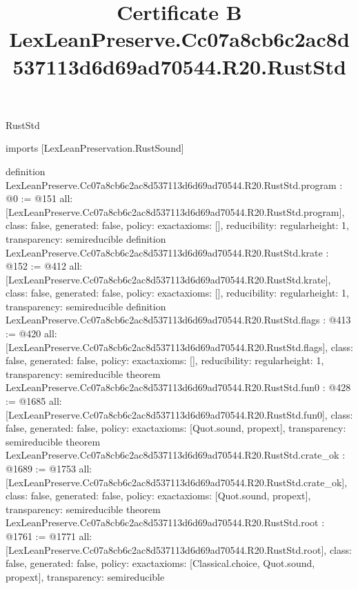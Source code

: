 \begin{lexlean}{RustStd}
\title{Certificate B LexLeanPreserve.Cc07a8cb6c2ac8d537113d6d69ad70544.R20.RustStd}
\begin{coremodule}
imports [LexLeanPreservation.RustSound]

definition LexLeanPreserve.Cc07a8cb6c2ac8d537113d6d69ad70544.R20.RustStd.program : @0 := @151 {
  all: [LexLeanPreserve.Cc07a8cb6c2ac8d537113d6d69ad70544.R20.RustStd.program],
  class: false,
  generated: false,
  policy: exact{axioms: []},
  reducibility: regular{height: 1},
  transparency: semireducible
}
definition LexLeanPreserve.Cc07a8cb6c2ac8d537113d6d69ad70544.R20.RustStd.krate : @152 := @412 {
  all: [LexLeanPreserve.Cc07a8cb6c2ac8d537113d6d69ad70544.R20.RustStd.krate],
  class: false,
  generated: false,
  policy: exact{axioms: []},
  reducibility: regular{height: 1},
  transparency: semireducible
}
definition LexLeanPreserve.Cc07a8cb6c2ac8d537113d6d69ad70544.R20.RustStd.flags : @413 := @420 {
  all: [LexLeanPreserve.Cc07a8cb6c2ac8d537113d6d69ad70544.R20.RustStd.flags],
  class: false,
  generated: false,
  policy: exact{axioms: []},
  reducibility: regular{height: 1},
  transparency: semireducible
}
theorem LexLeanPreserve.Cc07a8cb6c2ac8d537113d6d69ad70544.R20.RustStd.fun0 : @428 := @1685 {
  all: [LexLeanPreserve.Cc07a8cb6c2ac8d537113d6d69ad70544.R20.RustStd.fun0],
  class: false,
  generated: false,
  policy: exact{axioms: [Quot.sound, propext]},
  transparency: semireducible
}
theorem LexLeanPreserve.Cc07a8cb6c2ac8d537113d6d69ad70544.R20.RustStd.crate_ok : @1689 := @1753 {
  all: [LexLeanPreserve.Cc07a8cb6c2ac8d537113d6d69ad70544.R20.RustStd.crate_ok],
  class: false,
  generated: false,
  policy: exact{axioms: [Quot.sound, propext]},
  transparency: semireducible
}
theorem LexLeanPreserve.Cc07a8cb6c2ac8d537113d6d69ad70544.R20.RustStd.root : @1761 := @1771 {
  all: [LexLeanPreserve.Cc07a8cb6c2ac8d537113d6d69ad70544.R20.RustStd.root],
  class: false,
  generated: false,
  policy: exact{axioms: [Classical.choice, Quot.sound, propext]},
  transparency: semireducible
}


\end{coremodule}
\end{lexlean}
